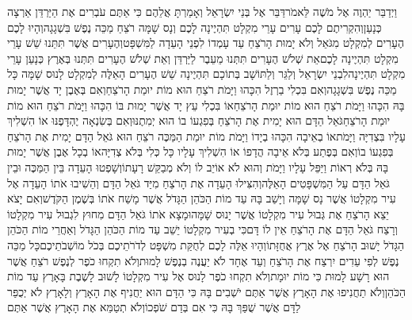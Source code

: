 \documentclass[../main/main.tex]{subfiles}
\begin{document}
\begin{multicols*}{\ncols}
וַיְדַבֵּר יַהְוֶה אֶל מֹשֶׁה לֵּאמֹר\PreVerseSpace{}דַּבֵּר אֶל בְּנֵי יִשְׂרָאֵל וְאָמַרְתָּ אֲלֵהֶם כִּי אַתֶּם עֹבְרִים אֶת הַיַּרְדֵּן אַרְצָה כְּנָעַן\PreVerseSpace{}וְהִקְרִיתֶם לָכֶם עָרִים עָרֵי מִקְלָט תִּהְיֶינָה לָכֶם וְנָס שָׁמָּה רֹצֵחַ מַכֵּה נֶפֶשׁ בִּשְׁגָגָה\PreVerseSpace{}וְהָיוּ לָכֶם הֶעָרִים לְמִקְלָט מִגֹּאֵל וְלֹא יָמוּת הָרֹצֵחַ עַד עָמְדוֹ לִפְנֵי הָעֵדָה לַמִּשְׁפָּט\PreVerseSpace{}וְהֶעָרִים אֲשֶׁר תִּתֵּנוּ שֵׁשׁ עָרֵי מִקְלָט תִּהְיֶינָה לָכֶם\PreVerseSpace{}אֵת שְׁלֹשׁ הֶעָרִים תִּתְּנוּ מֵעֵבֶר לַיַּרְדֵּן וְאֵת שְׁלֹשׁ הֶעָרִים תִּתְּנוּ בְּאֶרֶץ כְּנָעַן עָרֵי מִקְלָט תִּהְיֶינָה\PreVerseSpace{}לִבְנֵי יִשְׂרָאֵל וְלַגֵּר וְלַתּוֹשָׁב בְּתוֹכָם תִּהְיֶינָה שֵׁשׁ הֶעָרִים הָאֵלֶּה לְמִקְלָט לָנוּס שָׁמָּה כָּל מַכֵּה נֶפֶשׁ בִּשְׁגָגָה\PreVerseSpace{}וְאִם בִּכְלִי בַרְזֶל הִכָּהוּ וַיָּמֹת רֹצֵחַ הוּא מוֹת יוּמַת הָרֹצֵחַ\PreVerseSpace{}וְאִם בְּאֶבֶן יָד אֲשֶׁר יָמוּת בָּהּ הִכָּהוּ וַיָּמֹת רֹצֵחַ הוּא מוֹת יוּמַת הָרֹצֵחַ\PreVerseSpace{}אוֹ בִּכְלִי עֵץ יָד אֲשֶׁר יָמוּת בּוֹ הִכָּהוּ וַיָּמֹת רֹצֵחַ הוּא מוֹת יוּמַת הָרֹצֵחַ\PreVerseSpace{}גֹּאֵל הַדָּם הוּא יָמִית אֶת הָרֹצֵחַ בְּפִגְעוֹ בוֹ הוּא יְמִתֶנּוּ\PreVerseSpace{}וְאִם בְּשִׂנְאָה יֶהְדָּפֶנּוּ אוֹ הִשְׁלִיךְ עָלָיו בִּצְדִיָּה וַיָּמֹת\PreVerseSpace{}אוֹ בְאֵיבָה הִכָּהוּ בְיָדוֹ וַיָּמֹת מוֹת יוּמַת הַמַּכֶּה רֹצֵחַ הוּא גֹּאֵל הַדָּם יָמִית אֶת הָרֹצֵחַ בְּפִגְעוֹ בוֹ\PreVerseSpace{}וְאִם בְּפֶתַע בְּלֹא אֵיבָה הֲדָפוֹ אוֹ הִשְׁלִיךְ עָלָיו כָּל כְּלִי בְּלֹא צְדִיָּה\PreVerseSpace{}אוֹ בְכָל אֶבֶן אֲשֶׁר יָמוּת בָּהּ בְּלֹא רְאוֹת וַיַּפֵּל עָלָיו וַיָּמֹת וְהוּא לֹא אוֹיֵב לוֹ וְלֹא מְבַקֵּשׁ רָעָתוֹ\PreVerseSpace{}וְשָׁפְטוּ הָעֵדָה בֵּין הַמַּכֶּה וּבֵין גֹּאֵל הַדָּם עַל הַמִּשְׁפָּטִים הָאֵלֶּה\PreVerseSpace{}וְהִצִּילוּ הָעֵדָה אֶת הָרֹצֵחַ מִיַּד גֹּאֵל הַדָּם וְהֵשִׁיבוּ אֹתוֹ הָעֵדָה אֶל עִיר מִקְלָטוֹ אֲשֶׁר נָס שָׁמָּה וְיָשַׁב בָּהּ עַד מוֹת הַכֹּהֵן הַגָּדֹל אֲשֶׁר מָשַׁח אֹתוֹ בְּשֶׁמֶן הַקֹּדֶשׁ\PreVerseSpace{}וְאִם יָצֹא יֵצֵא הָרֹצֵחַ אֶת גְּבוּל עִיר מִקְלָטוֹ אֲשֶׁר יָנוּס שָׁמָּה\PreVerseSpace{}וּמָצָא אֹתוֹ גֹּאֵל הַדָּם מִחוּץ לִגְבוּל עִיר מִקְלָטוֹ וְרָצַח גֹּאֵל הַדָּם אֶת הָרֹצֵחַ אֵין לוֹ דָּם\PreVerseSpace{}כִּי בְעִיר מִקְלָטוֹ יֵשֵׁב עַד מוֹת הַכֹּהֵן הַגָּדֹל וְאַחֲרֵי מוֹת הַכֹּהֵן הַגָּדֹל יָשׁוּב הָרֹצֵחַ אֶל אֶרֶץ אֲחֻזָּתוֹ\PreVerseSpace{}וְהָיוּ אֵלֶּה לָכֶם לְחֻקַּת מִשְׁפָּט לְדֹרֹתֵיכֶם בְּכֹל מוֹשְׁבֹתֵיכֶם\PreVerseSpace{}כָּל מַכֵּה נֶפֶשׁ לְפִי עֵדִים יִרְצַח אֶת הָרֹצֵחַ וְעֵד אֶחָד לֹא יַעֲנֶה בְנֶפֶשׁ לָמוּת\PreVerseSpace{}וְלֹא תִקְחוּ כֹפֶר לְנֶפֶשׁ רֹצֵחַ אֲשֶׁר הוּא רָשָׁע לָמוּת כִּי מוֹת יוּמָת\PreVerseSpace{}וְלֹא תִקְחוּ כֹפֶר לָנוּס אֶל עִיר מִקְלָטוֹ לָשׁוּב לָשֶׁבֶת בָּאָרֶץ עַד מוֹת הַכֹּהֵן\PreVerseSpace{}וְלֹא תַחֲנִיפוּ אֶת הָאָרֶץ אֲשֶׁר אַתֶּם יֹשְׁבִים\OmitEnd{} בָּהּ כִּי הַדָּם הוּא יַחֲנִיף אֶת הָאָרֶץ וְלָאָרֶץ לֹא יְכֻפַּר לַדָּם אֲשֶׁר שֻׁפַּךְ בָּהּ כִּי אִם בְּדַם שֹׁפְכוֹ\PreVerseSpace{}וְלֹא תְטַמֵּא אֶת הָאָרֶץ אֲשֶׁר אַתֶּם 
\end{multicols*}
\end{document}
